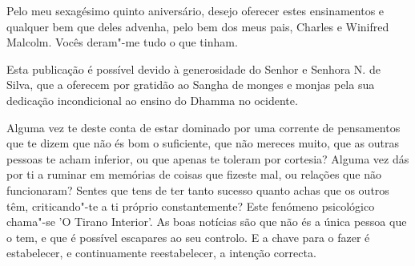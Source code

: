 \clearpage
\thispagestyle{empty}

{}

\vspace*{0.8\baselineskip}

Pelo meu sexagésimo quinto aniversário, desejo oferecer estes
ensinamentos e qualquer bem que deles advenha, pelo bem dos meus pais,
Charles e Winifred Malcolm. Vocês deram"-me tudo o que tinham.

\clearpage
\thispagestyle{empty}

{}

\enlargethispage*{\baselineskip}

\vspace*{0.8\baselineskip}

Esta publicação é possível devido à generosidade do Senhor e Senhora N.
de Silva, que a oferecem por gratidão ao Sangha de monges e monjas pela
sua dedicação incondicional ao ensino do Dhamma no ocidente.

Alguma vez te deste conta de estar dominado por uma corrente de
pensamentos que te dizem que não és bom o suficiente, que não mereces
muito, que as outras pessoas te acham inferior, ou que apenas te toleram
por cortesia? Alguma vez dás por ti a ruminar em memórias de coisas que
fizeste mal, ou relações que não funcionaram? Sentes que tens de ter
tanto sucesso quanto achas que os outros têm, criticando"-te a ti próprio
constantemente? Este fenómeno psicológico chama"-se 'O Tirano Interior'.
As boas notícias são que não és a única pessoa que o tem, e que é
possível escapares ao seu controlo. E a chave para o fazer é
estabelecer, e continuamente reestabelecer, a intenção correcta.

